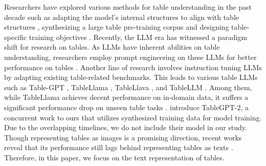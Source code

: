 \documentclass[11pt]{article}
\begin{document}
Researchers have explored various methods for table understanding in the past decade such as adapting the model's internal structures to align with table structures \citep{lebret-etal-2016-neural, liu2018table, yang-etal-2022-tableformer}, synthesizing a large table pre-training corpus and designing table-specific training objectives \citep{yin-etal-2020-tabert, herzig-etal-2020-tapas}.
Recently, the LLM era has witnessed a paradigm shift for research on tables.
As LLMs have inherent abilities on table understanding, researchers employ prompt engineering on these LLMs for better performance on tables \citep{chang2023prompt, deng-etal-2024-tables}.
Another line of research involves instruction tuning LLMs by adapting existing table-related benchmarks.
This leads to various table LLMs such as Table-GPT \citep{li2023table}, TableLlama \citep{zhang-etal-2024-tablellama}, TableLlava \citep{zheng2024multimodal}, and TableLLM \citep{zhang2024tablellm}. 
Among them, while TableLlama achieves decent performance on in-domain data, it suffers a significant performance drop on unseen table tasks \citep{zheng2024multimodal}.
\citet{su2024tablegpt2} introduce TableGPT-2, a concurrent work to ours that utilizes synthesized training data for model training. 
Due to the overlapping timelines, we do not include their model in our study.
Though representing tables as images is a promising direction, recent works reveal that its performance still lags behind representing tables as texts \citep{deng-etal-2024-tables}.
Therefore, in this paper, we focus on the text representation of tables.
\end{document}

